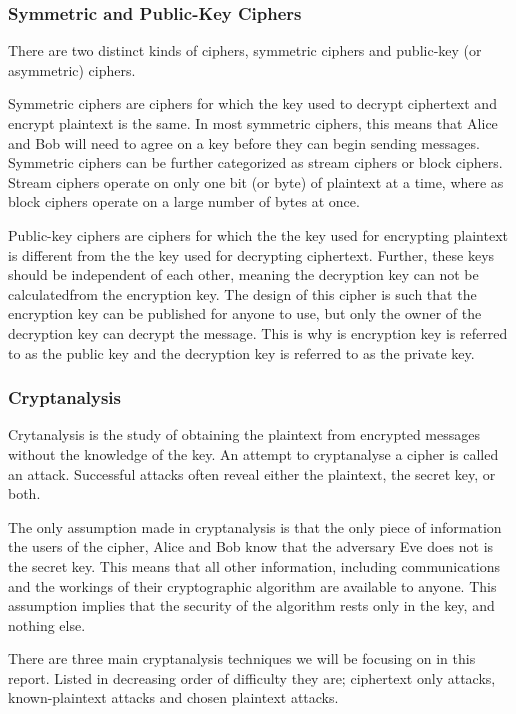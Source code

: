 \documentclass[12pt, a4paper, draft]{report}
\begin{document}
\subsubsection{Symmetric and Public-Key Ciphers}

There are two distinct kinds of ciphers, symmetric ciphers and public-key
(or asymmetric) ciphers.

Symmetric ciphers are ciphers for which the key used to decrypt ciphertext
and encrypt plaintext is the same. In most symmetric ciphers, this means
that Alice and Bob will need to agree on a key before they can begin
sending messages. Symmetric ciphers can be further categorized as stream
ciphers or block ciphers. Stream ciphers operate on only one bit (or byte)
of plaintext at a time, where as block ciphers operate on a large number
of bytes at once.

Public-key ciphers are ciphers for which the the key used for encrypting
plaintext is different from the the key used for decrypting ciphertext.
Further, these keys should be independent of each other, meaning the
decryption key can not be calculated\footnotemark from the encryption key.
The design of this cipher is such that the encryption key can be published
for anyone to use, but only the owner of the decryption key can decrypt
the message. This is why is encryption key is referred to as the public
key and the decryption key is referred to as the private key.


\subsubsection{Cryptanalysis}

Crytanalysis is the study of obtaining the plaintext from encrypted
messages without the knowledge of the key. An attempt to cryptanalyse
a cipher is called an attack. Successful attacks often reveal either the
plaintext, the secret key, or both.

The only assumption made in cryptanalysis is that the only piece of
information the users of the cipher, Alice and Bob know that the adversary
Eve does not is the secret key. This means that all other information,
including communications and the workings of their cryptographic algorithm
are available to anyone. This assumption implies that the security of
the algorithm rests only in the key, and nothing else.

There are three main cryptanalysis techniques we will be focusing on in
this report. Listed in decreasing order of difficulty they are; ciphertext
only attacks, known-plaintext attacks and chosen plaintext attacks.
\end{document}
